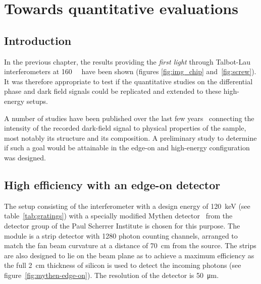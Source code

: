 \chapter{Towards quantitative evaluations}\label{ch:towards}
\section{Introduction}
In the previous chapter, the results providing the \emph{first light}
through Talbot-Lau interferometers at \SI{160}{\kilo\voltpeak} have been
shown (figures \ref{fig:img_chip} and~\ref{fig:screw}). It was therefore
appropriate to test if the quantitative studies on the differential phase
and dark field signals could be replicated and extended to these
high-energy setups.

A number of studies have been published over the last few
years~\parencite{Yashiro:10,Cong:12,Ritter:14,Schleede2012a,Meinel_2014,Scherer2015NoninvasiveDO} 
connecting the intensity of the recorded dark-field signal to physical
properties of the sample, most notably its structure and its composition. A
preliminary study to determine if such a goal would be attainable in the
edge-on and high-energy configuration was designed.

\section{High efficiency with an edge-on detector}\label{sec:mythen-edge-on}
The setup consisting of the interferometer with a design energy of
\SI{120}{\kilo\eV} (see table~\ref{tab:gratings}) with a specially modified
Mythen detector~\parencite{SCHMITT2003267} from the detector group of the Paul Scherrer Institute is chosen
for this purpose. The
module is a strip detector with 1280 photon counting channels, arranged to
match the fan beam curvature at a distance of \SI{70}{\centi\meter} from the
source. The strips are also designed to lie on the beam plane as to achieve
a maximum efficiency as the full \SI{2}{\centi\meter} thickness of silicon
is used to detect the incoming photons (see
figure~\ref{fig:mythen-edge-on}). The resolution of the detector is
\SI{50}{\micro\meter}.

